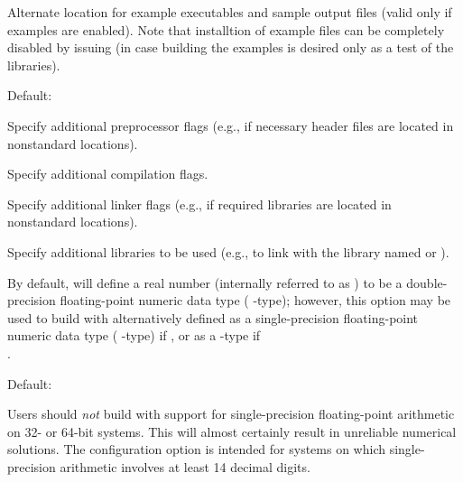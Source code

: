 \begin{config}
\item {}

  Alternate location for example executables and sample output files (valid only if
  examples are enabled). Note that installtion of example files can be completely disabled
  by issuing  (in case building the examples is desired only as a test of
  the {\sundials} libraries).

  Default: 

\item {}

  Specify additional {\C} preprocessor flags 
  (e.g.,  if necessary header files are located in
   nonstandard locations).

\item {}

  Specify additional {\C} compilation flags.

\item {}

  Specify additional linker flags (e.g.,  if
  required libraries are located in nonstandard locations).

\item {}

  Specify additional libraries to be used (e.g.,  to
  link with the library named  or ).

\item {}

  By default, {\sundials} will define a real number (internally referred to as
  ) to be a double-precision floating-point numeric data type
  ( {\C}-type); however, this option may be used to build {\sundials}
  with  alternatively defined as a single-precision floating-point
  numeric data type ( {\C}-type) if , or as a
   {\C}-type if \\ .

  Default: 

  {\warn}Users should {\em not} build {\sundials} with support for
  single-precision floating-point arithmetic on 32- or 64-bit systems.
  This will almost certainly result in unreliable numerical solutions.
  The configuration option  is intended for
  systems on which single-precision arithmetic involves at least 14 decimal
  digits.

\end{config}

